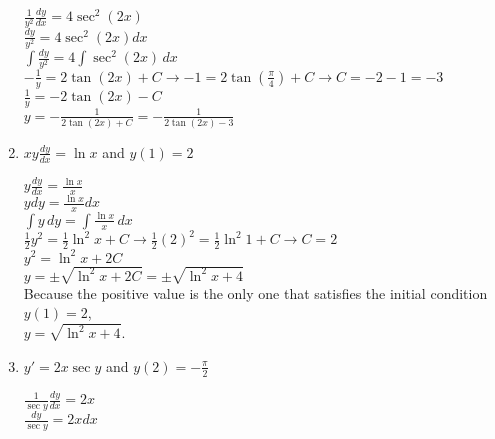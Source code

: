 \documentclass[10pt,letterpaper]{report}
\begin{document}
\begin{enumerate}
    $\frac{1}{y^{2}}\frac{dy}{dx}=4\sec^{2}{\left(2x\right)}$ \\
    
    $\frac{dy}{y^{2}}=4\sec^{2}{\left(2x\right)}dx$ \\
    
    $\int{\frac{dy}{y^{2}}}=4\int{\sec^{2}{\left(2x\right)}}\,dx$ \\
    
    $-\frac{1}{y}=2\tan{\left(2x\right)}+C\rightarrow -1=2\tan{\left(\frac{\pi}{4}\right)}+C\rightarrow C=-2-1=-3$ \\
    
    $\frac{1}{y}=-2\tan{\left(2x\right)}-C$ \\
    
    $y=-\frac{1}{2\tan{\left(2x\right)}+C}=-\frac{1}{2\tan{\left(2x\right)}-3}$ \\
    
    \pagebreak
    
  \item{$xy\frac{dy}{dx}=\ln{x}$ and $y(1)=2$ \\} 
  
    $y\frac{dy}{dx}=\frac{\ln{x}}{x}$ \\
    
    $ydy = \frac{\ln{x}}{x}dx$ \\
    
    $\int{y}\,dy=\int{\frac{\ln{x}}{x}}\,dx$ \\
    
    $\frac{1}{2}y^{2}=\frac{1}{2}\ln^{2}{x}+C\rightarrow \frac{1}{2}\left(2\right)^{2}=\frac{1}{2}\ln^{2}{1}+C\rightarrow C=2$ \\
    
    $y^{2}=\ln^{2}{x}+2C$ \\
    
    $y=\pm\sqrt{\ln^{2}{x}+2C}=\pm\sqrt{\ln^{2}{x}+4}$ \\
    
    Because the positive value is the only one that satisfies the initial condition $y(1)=2$, \\ $y=\sqrt{\ln^{2}{x}+4}$. \\
    
  \item{$y'=2x\sec{y}$ and $y(2)=-\frac{\pi}{2}$ \\}
  
    $\frac{1}{\sec{y}}\frac{dy}{dx}=2x$ \\
    
    $\frac{dy}{\sec{y}}=2xdx$ \\
    

\end{enumerate}
\end{document}
